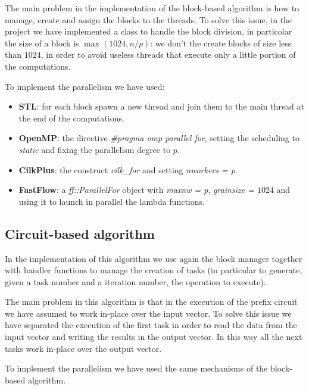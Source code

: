 \documentclass{article}
\begin{document}
The main problem in the implementation of the block-based algorithm is how to manage, create and assign the blocks to the threads. To solve this issue, in the project we have implemented a class to handle the block division, in particolar the size of a block is $\max(1024, n/p)$: we don't the create blocks of size less than $1024$, in order to avoid useless threads that execute only a little portion of the computations.

\medskip

To implement the parallelism we have used:

\begin{itemize}
  \item \textbf{STL}: for each block spawn a new thread and join them to the main thread at the end of the computations.
  \item \textbf{OpenMP}: the directive \textit{\#pragma omp parallel for}, setting the scheduling to \textit{static} and fixing the parallelism degree to $p$.
  \item \textbf{CilkPlus}: the construct \textit{cilk\_for} and setting \textit{nworkers = p}.
  \item \textbf{FastFlow}: a \textit{ff::ParallelFor} object with \textit{maxnw = p}, \textit{grainsize = $1024$} and using it to launch in parallel the lambda functions.
\end{itemize}

\subsection{Circuit-based algorithm}

In the implementation of this algorithm we use again the block manager together with handler functions to manage the creation of tasks (in particular to generate, given a task number and a iteration number, the operation to execute).

\smallskip

The main problem in this algorithm is that in the execution of the prefix circuit we have assumed to work in-place over the input vector. To solve this issue we have separated the execution of the first task in order to read the data from the input vector and writing the results in the output vector. In this way all the next tasks work in-place over the output vector.

\smallskip

To implement the parallelism we have used the same mechanisms of the block-based algorithm.
\end{document}
